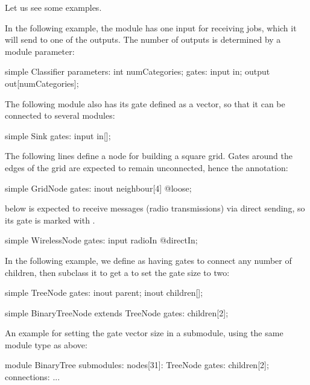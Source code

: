 Let us see some examples.

In the following example, the  module has one input for
receiving jobs, which it will send to one of the outputs. The number of
outputs is determined by a module parameter:

\begin{ned}
simple Classifier {
    parameters:
        int numCategories;
    gates:
        input in;
        output out[numCategories];
}
\end{ned}

The following  module also has its  gate defined
as a vector, so that it can be connected to several modules:

\begin{ned}
simple Sink {
    gates:
        input in[];
}
\end{ned}

The following lines define a node for building a square grid. Gates around
the edges of the grid are expected to remain unconnected, hence the
 annotation:

\begin{ned}
simple GridNode {
    gates:
        inout neighbour[4] @loose;
}
\end{ned}

 below is expected to receive messages (radio transmissions)
via direct sending, so its  gate is marked with .

\begin{ned}
simple WirelessNode {
    gates:
        input radioIn @directIn;
}
\end{ned}

In the following example, we define  as having gates to connect
any number of children, then subclass it to get a  to
set the gate size to two:

\begin{ned}
simple TreeNode {
    gates:
        inout parent;
        inout children[];
}

simple BinaryTreeNode extends TreeNode {
    gates:
        children[2];
}
\end{ned}

An example for setting the gate vector size in a submodule, using the same
 module type as above:

\begin{ned}
module BinaryTree {
    submodules:
        nodes[31]: TreeNode {
            gates:
                children[2];
        }
    connections:
        ...
}
\end{ned}



